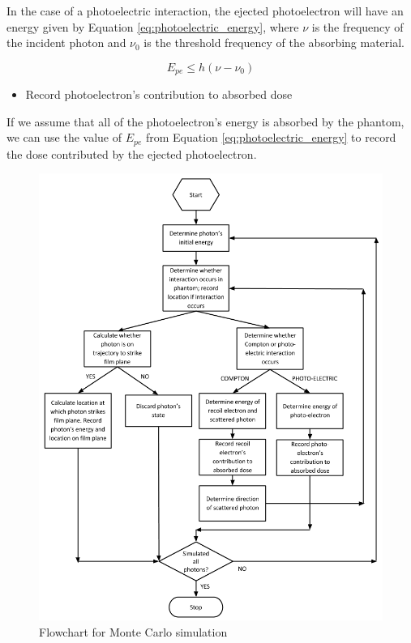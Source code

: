 \documentclass[12pt]{article} %
\begin{document}
In the case of a photoelectric interaction, the ejected photoelectron will have an energy given by Equation \ref{eq:photoelectric_energy}, where $\nu$ is the frequency of the incident photon and $\nu_{0}$ is the threshold frequency of the absorbing material.

\begin{equation}
E_{pe} \le h\left(\nu - \nu_{0}\right)
\label{eq:photoelectric_energy}
\end{equation}

\begin{itemize}
\item Record photoelectron's contribution to absorbed dose
\end{itemize}

If we assume that all of the photoelectron's energy is absorbed by the phantom, we can use the value of $E_{pe}$ from Equation \ref{eq:photoelectric_energy} to record the dose contributed by the ejected photoelectron.

\begin{figure}
\centering
\includegraphics[scale=.575]{./images/monte_carlo.png}
\caption{Flowchart for Monte Carlo simulation}
\label{monte_carlo}
\end{figure}
\end{document}

